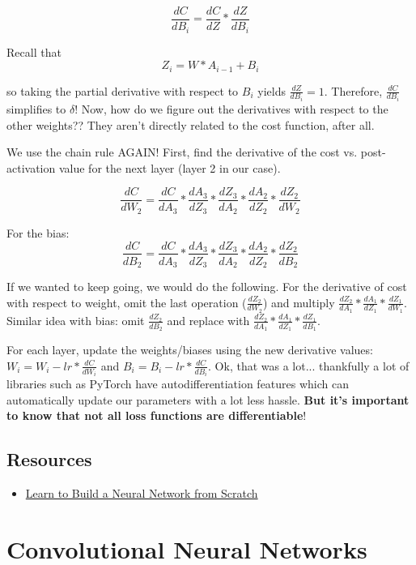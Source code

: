 \documentclass[12pt]{article}
\begin{document}
$$\frac{dC}{dB_i} = \frac{dC}{dZ} * \frac{dZ}{dB_i}$$

Recall that
$$Z_i = W * A_{i-1} + B_i$$

so taking the partial derivative with respect to $B_i$ yields $\frac{dZ}{dB_i} = 1$. Therefore, $\frac{dC}{dB_i}$ simplifies to $\delta$! Now, how do we figure out the derivatives with respect to the other weights?? They aren't directly related to the cost function, after all. 

We use the chain rule AGAIN! First, find the derivative of the cost vs. post-activation value for the next layer (layer 2 in our case). 

$$\frac{dC}{dW_2} = \frac{dC}{dA_3} * \frac{dA_3}{dZ_3} * \frac{dZ_3}{dA_2} * \frac{dA_2}{dZ_2} * \frac{dZ_2}{dW_2}$$

For the bias:
$$\frac{dC}{dB_2} = \frac{dC}{dA_3} * \frac{dA_3}{dZ_3} * \frac{dZ_3}{dA_2} * \frac{dA_2}{dZ_2} * \frac{dZ_2}{dB_2}$$

If we wanted to keep going, we would do the following. For the derivative of cost with respect to weight, omit the last operation ($\frac{dZ_2}{dW_2}$) and multiply $\frac{dZ_2}{dA_1} * \frac{dA_1}{dZ_1} * \frac{dZ_1}{dW_1}$. Similar idea with bias: omit $\frac{dZ_2}{dB_2}$ and replace with $\frac{dZ_2}{dA_1} * \frac{dA_1}{dZ_1} * \frac{dZ_1}{dB_1}$. 


For each layer, update the weights/biases using the new derivative values: $W_i = W_i - lr * \frac{dC}{dW_i}$ and $B_i = B_i - lr * \frac{dC}{dB_i}$. Ok, that was a lot... thankfully a lot of libraries such as PyTorch have autodifferentiation features which can automatically update our parameters with a lot less hassle. \textbf{But it's important to know that not all loss functions are differentiable}!

\subsection{Resources}
\begin{itemize}
  
  \item \href{https://medium.com/@waadlingaadil/learn-to-build-a-neural-network-from-scratch-yes-really-cac4ca457efc}{Learn to Build a Neural Network from Scratch}
\end{itemize}

\section{Convolutional Neural Networks}
\end{document}
